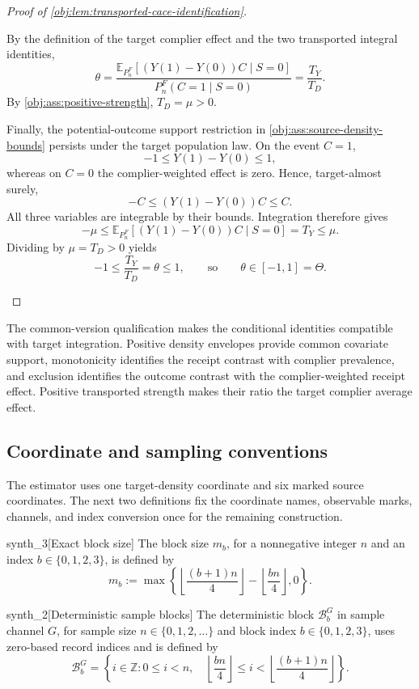 \documentclass[11pt]{article}
\begin{document}
\begin{proof}[Proof of \cref{obj:lem:transported-cace-identification}]
\begin{enumerate}
By the definition of the target complier effect and the two transported integral identities,
\[
\theta
=
\frac{\mathbb E_{P_n^F}[(Y(1)-Y(0))C\mid S=0]}
     {P_n^F(C=1\mid S=0)}
=
\frac{T_Y}{T_D}.
\]
By \cref{obj:ass:positive-strength}, \(T_D=\mu>0\).

Finally, the potential-outcome support restriction in
\cref{obj:ass:source-density-bounds} persists under the target population law. On the event \(C=1\),
\[
-1\le Y(1)-Y(0)\le1,
\]
whereas on \(C=0\) the complier-weighted effect is zero. Hence, target-almost surely,
\[
-C\le (Y(1)-Y(0))C\le C.
\]
All three variables are integrable by their bounds. Integration therefore gives
\[
-\mu
\le\mathbb E_{P_n^F}[(Y(1)-Y(0))C\mid S=0]
=T_Y
\le\mu.
\]
Dividing by \(\mu=T_D>0\) yields
\[
-1\le\frac{T_Y}{T_D}=\theta\le1,
\qquad\text{so}\qquad
\theta\in[-1,1]=\Theta.
\]
\end{enumerate}
\end{proof}

The common-version qualification makes the conditional identities compatible with target integration. Positive density envelopes provide common covariate support, monotonicity identifies the receipt contrast with complier prevalence, and exclusion identifies the outcome contrast with the complier-weighted receipt effect. Positive transported strength makes their ratio the target complier average effect.

\subsection{Coordinate and sampling conventions}

The estimator uses one target-density coordinate and six marked source coordinates. The next two definitions fix the coordinate names, observable marks, channels, and index conversion once for the remaining construction.

\begin{definitionv}{synth_3}[Exact block size]
The block size \(m_b\), for a nonnegative integer \(n\) and an index \(b\in\{0,1,2,3\}\), is defined by
\[
m_b := \max\left\{
\left\lfloor \frac{(b+1)n}{4} \right\rfloor
-
\left\lfloor \frac{bn}{4} \right\rfloor,
0
\right\}.
\]
\end{definitionv}

\begin{definitionv}{synth_2}[Deterministic sample blocks]
The deterministic block \(\mathcal B_b^G\) in sample channel \(G\), for sample size \(n\in\{0,1,2,\ldots\}\) and block index \(b\in\{0,1,2,3\}\), uses zero-based record indices and is defined by
\[
\mathcal B_b^G
=
\left\{
i\in\mathbb Z:
0\le i<n,\quad
\left\lfloor\frac{bn}{4}\right\rfloor
\le i<
\left\lfloor\frac{(b+1)n}{4}\right\rfloor
\right\}.
\]
\end{definitionv}
\end{document}
